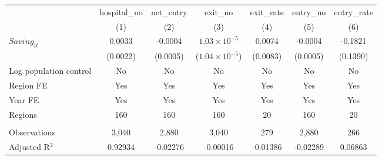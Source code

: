 \begingroup
\centering
\begin{tabular}{lcccccc}
   \toprule
                          & hospital\_no  & net\_entry  & exit\_no                & exit\_rate  & entry\_no  & entry\_rate \\    
                          & (1)           & (2)         & (3)                     & (4)         & (5)        & (6)\\  
   \midrule 
   $Saving_{it}$          & 0.0033        & -0.0004     & $1.03\times 10^{-5}$    & 0.0074      & -0.0004    & -0.1821\\   
                          & (0.0022)      & (0.0005)    & ($1.04\times 10^{-5}$)  & (0.0083)    & (0.0005)   & (0.1390)\\   
   Log population control & No            & No          & No                      & No          & No         & No\\  
   Region FE              & Yes           & Yes         & Yes                     & Yes         & Yes        & Yes\\  
   Year FE                & Yes           & Yes         & Yes                     & Yes         & Yes        & Yes\\  
   Regions                & 160           & 160         & 160                     & 20          & 160        & 20\\  
    \\
   Observations           & 3,040         & 2,880       & 3,040                   & 279         & 2,880      & 266\\  
   Adjusted R$^2$         & 0.92934       & -0.02276    & -0.00016                & -0.01386    & -0.02289   & 0.06863\\  
   \bottomrule
\end{tabular}
\par\endgroup
